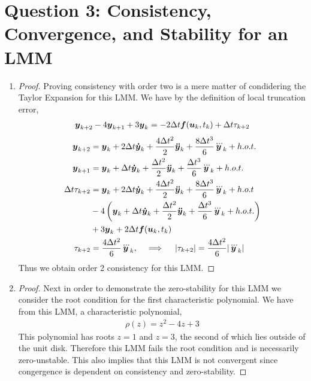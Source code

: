 \documentclass{article}
\begin{document}
\begin{enumerate}[label=\alph*)]
\end{enumerate}

\section*{Question 3: Consistency, Convergence, and Stability for an LMM}

\begin{enumerate}[label=\alph*)]

  \item 
    
  \begin{proof}
    Proving consistency with order two is a mere matter of condidering the
    Taylor Expansion for this LMM. We have by the definition of local truncation
    error, 
    \begin{align}
       \boldsymbol{y}_{k+2} - 4\boldsymbol{y}_{k+1} + 3\boldsymbol{y}_k = -2\Delta t\boldsymbol{f}(\boldsymbol{u}_k, t_k) + \Delta t\tau_{k+2}
    \end{align}
    \begin{align*}
       \boldsymbol{y}_{k+2} &= \boldsymbol{y}_k + 2\Delta t \boldsymbol{\dot{y}}_k +
       \frac{4\Delta t^2}{2}\boldsymbol{\ddot{y}}_k + \frac{8\Delta t^3}{6}\boldsymbol{\dddot{y}}_k +  h.o.t.\\
       \boldsymbol{y}_{k+1} &= \boldsymbol{y}_k + \Delta t \boldsymbol{\dot{y}}_k + \frac{\Delta t^2}{2}\boldsymbol{\ddot{y}}_k 
       + \frac{\Delta t^3}{6}\boldsymbol{\dddot{y}}_k +h.o.t. \\
       \Delta t\tau_{k+2} &=  \boldsymbol{y}_k + 2\Delta t \boldsymbol{\dot{y}}_k +
       \frac{4\Delta t^2}{2}\boldsymbol{\ddot{y}}_k + \frac{8\Delta t^3}{6}\boldsymbol{\dddot{y}}_k +
       h.o.t \\ &- 4\left(\boldsymbol{y}_k + \Delta t \boldsymbol{\dot{y}}_k + \frac{\Delta t^2}{2}\boldsymbol{\ddot{y}}_k 
       + \frac{\Delta t^3}{6}\boldsymbol{\dddot{y}}_k +h.o.t. \right)\\ &+ 3\boldsymbol{y}_k +
       2\Delta t\boldsymbol{f}(\boldsymbol{u}_k, t_k)\\
       \tau_{k+2} &=  \frac{4\Delta t^2}{6}\boldsymbol{\dddot{y}}_k, \quad \implies \quad
       |\tau_{k+2}| = \frac{4\Delta t^2}{6}|\boldsymbol{\dddot{y}}_k|
    \end{align*}
    Thus we obtain order 2 consistency for this LMM.
  \end{proof}

  \item 

  \begin{proof}
    Next in order to demonstrate the zero-stability for this LMM we consider the
    root condition for the first characteristic polynomial. We have from this
    LMM, a characteristic polynomial, 
    \begin{align}
        \rho(z) = z^2 - 4z + 3
    \end{align}
    This polynomial has roots $z = 1$ and $z = 3$, the second of which lies
    outside of the unit disk. Therefore this LMM fails the root condition and is
    necessarily zero-unstable. This also implies that this LMM is not convergent
    since congergence is dependent on consistency and zero-stability. 
  \end{proof}


\end{enumerate}
\end{document}
